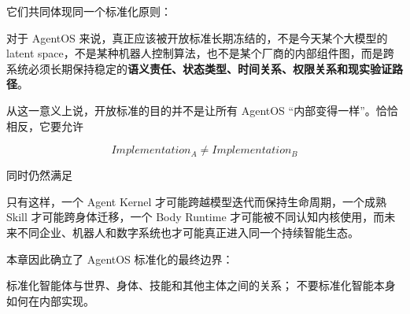 它们共同体现同一个标准化原则：

\begin{statementbox}
\centering
{}
\end{statementbox}

对于 AgentOS 来说，真正应该被开放标准长期冻结的，不是今天某个大模型的 latent space，不是某种机器人控制算法，也不是某个厂商的内部组件图，而是跨系统必须长期保持稳定的\textbf{语义责任、状态类型、时间关系、权限关系和现实验证路径}。

从这一意义上说，开放标准的目的并不是让所有 AgentOS ``内部变得一样''。恰恰相反，它要允许

\[
Implementation_A\neq Implementation_B
\]

同时仍然满足

\begin{statementbox}
\centering
{}
\end{statementbox}

只有这样，一个 Agent Kernel 才可能跨越模型迭代而保持生命周期，一个成熟 Skill 才可能跨身体迁移，一个 Body Runtime 才可能被不同认知内核使用，而未来不同企业、机器人和数字系统也才可能真正进入同一个持续智能生态。

本章因此确立了 AgentOS 标准化的最终边界：

\begin{remark}
标准化智能体与世界、身体、技能和其他主体之间的关系；
不要标准化智能本身如何在内部实现。
\end{remark}
